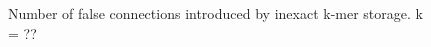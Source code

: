 \documentclass[12pt]{article} \usepackage{simplemargins}
\begin{document}
\begin{figure}
\caption{Number of false connections introduced by inexact k-mer storage.
k = ??}
\end{figure}
\end{document}
